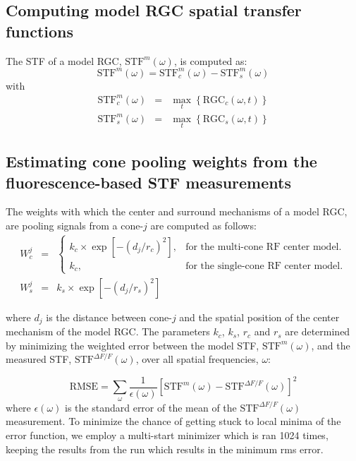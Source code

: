 \documentclass[11pt, oneside]{article}   	%
\begin{document}
\subsection{Computing model RGC spatial transfer functions}
The STF of a model RGC, $\mbox{STF}^{m}(\omega)$, is computed as: 
\begin{equation}
\mbox{STF}^{m}(\omega) = \mbox{STF}_{c}^{m}(\omega) - \mbox{STF}_{s}^{m}(\omega)
\end{equation}
%
\noindent with
%
\begin{eqnarray}
\mbox{STF}_{c}^{m}(\omega) & = &\max_{t} \left \{ \mbox{RGC}_c(\omega,t)  \right \} \\ 
\mbox{STF}_{s}^{m}(\omega) & = &\max_{t} \left \{ \mbox{RGC}_s(\omega,t)  \right \}
\end{eqnarray}


\subsection{Estimating cone pooling weights from the fluorescence-based STF measurements}

The weights with which the center and surround mechanisms of a model RGC, are pooling signals from a cone-$j$ are computed as follows:
\begin{eqnarray}
W_c^j  & = & \begin{cases}
   k_c \times \exp \left [ -\left( d_{j}/r_c \right) ^2 \right ], & \text{for the multi-cone RF center model}.\\
   k_c, & \text{for the single-cone RF center model}.
   \end{cases} \\
W_s^j &= &k_s \times \exp \left [ -\left( d_{j}/r_s \right) ^2 \right ]
\end{eqnarray}

\noindent where $d_j$ is the distance between cone-$j$ and the spatial position of the center mechanism of the model RGC. The parameters $k_c$, $k_s$, $r_c$ and $r_s$ are determined by minimizing the weighted error between the model STF, $\mbox{STF}^{m}(\omega)$, and the measured STF, $\mbox{STF}^{\Delta F / F}(\omega)$, over all spatial frequencies, $\omega$:

\begin{equation}
\mbox{RMSE} = \displaystyle \sum_{\omega} \frac{1}{\epsilon({\omega})} {\left [  \mbox{STF}^{m}(\omega)  - \mbox{STF}^{\Delta F / F}(\omega) \right ] }^2
\end{equation}
where $\epsilon({\omega})$ is the standard error of the mean of the $\mbox{STF}^{\Delta F / F}(\omega)$ measurement. To minimize the chance of getting stuck to local minima of the error function, we employ a multi-start minimizer which is ran 1024 times, keeping the results from the run which results in the minimum rms error.
\end{document}
